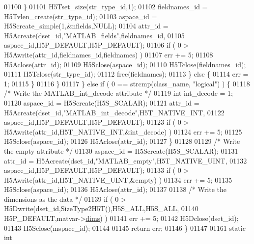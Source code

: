 \begin{DoxyCode}
01100                 \}
01101                 H5Tset\_size(str\_type\_id,1);
01102                 fieldnames\_id = H5Tvlen\_create(str\_type\_id);
01103                 aspace\_id     = H5Screate\_simple(1,&nfields,NULL);
01104                 attr\_id = H5Acreate(dset\_id,\textcolor{stringliteral}{"MATLAB\_fields"},fieldnames\_id,
01105                                     aspace\_id,H5P\_DEFAULT,H5P\_DEFAULT);
01106                 \textcolor{keywordflow}{if} ( 0 > H5Awrite(attr\_id,fieldnames\_id,fieldnames) )
01107                     err += 5;
01108                 H5Aclose(attr\_id);
01109                 H5Sclose(aspace\_id);
01110                 H5Tclose(fieldnames\_id);
01111                 H5Tclose(str\_type\_id);
01112                 free(fieldnames);
01113             \} \textcolor{keywordflow}{else} \{
01114                 err = 1;
01115             \}
01116         \}
01117     \} \textcolor{keywordflow}{else} \textcolor{keywordflow}{if} ( 0 == strcmp(class\_name, \textcolor{stringliteral}{"logical"}) ) \{
01118         \textcolor{comment}{/* Write the MATLAB\_int\_decode attribute */}
01119         \textcolor{keywordtype}{int} int\_decode = 1;
01120         aspace\_id = H5Screate(H5S\_SCALAR);
01121         attr\_id = H5Acreate(dset\_id,\textcolor{stringliteral}{"MATLAB\_int\_decode"},H5T\_NATIVE\_INT,
01122                             aspace\_id,H5P\_DEFAULT,H5P\_DEFAULT);
01123         \textcolor{keywordflow}{if} ( 0 > H5Awrite(attr\_id,H5T\_NATIVE\_INT,&int\_decode) )
01124             err += 5;
01125         H5Sclose(aspace\_id);
01126         H5Aclose(attr\_id);
01127     \}
01128 
01129     \textcolor{comment}{/* Write the empty attribute */}
01130     aspace\_id = H5Screate(H5S\_SCALAR);
01131     attr\_id = H5Acreate(dset\_id,\textcolor{stringliteral}{"MATLAB\_empty"},H5T\_NATIVE\_UINT,
01132                         aspace\_id,H5P\_DEFAULT,H5P\_DEFAULT);
01133     \textcolor{keywordflow}{if} ( 0 > H5Awrite(attr\_id,H5T\_NATIVE\_UINT,&empty) )
01134         err += 5;
01135     H5Sclose(aspace\_id);
01136     H5Aclose(attr\_id);
01137 
01138     \textcolor{comment}{/* Write the dimensions as the data */}
01139     \textcolor{keywordflow}{if} ( 0 > H5Dwrite(dset\_id,SizeType2H5T(),H5S\_ALL,H5S\_ALL,
01140                       H5P\_DEFAULT,matvar->\hyperlink{group___m_a_t_a8e01234e1c862ce3472bb37f5a09b92c}{dims}) )
01141         err += 5;
01142     H5Dclose(dset\_id);
01143     H5Sclose(mspace\_id);
01144 
01145     \textcolor{keywordflow}{return} err;
01146 \}
01147 
01161 \textcolor{keyword}{static} \textcolor{keywordtype}{int}

\end{DoxyCode}
